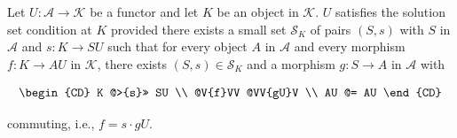 Let $U\colon \mathcal{A} \longrightarrow \mathcal{K}$ be a functor and let $K$ be an object in $\mathcal{K}$. $U$ satisfies the solution set condition at $K$ provided there exists a small set $\mathcal{S}_K$ of pairs $(S, s)$ with $S$ in $\mathcal{A}$ and $s\colon K \longrightarrow SU$ such that for every object $A$ in $\mathcal{A}$ and every morphism $f\colon K \longrightarrow AU$ in $\mathcal{K}$, there exists $(S, s) \in \mathcal{S}_K$ and a morphism $g\colon S \longrightarrow A$ in $\mathcal{A}$ with

\[
\begin{CD}
K @>{s}>> SU \\
@V{f}VV @VV{gU}V \\
AU @= AU
\end{CD}
\]

commuting, i.e., $f = s \cdot gU$.
